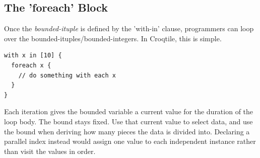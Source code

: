 \subsection*{The 'foreach' Block}

Once the \emph{bounded-ituple} is defined by the 'with-in' clause, programmers can loop over the bounded-ituples/bounded-integers. In Croqtile, this is simple.

\begin{lstlisting}[language=croqtile,caption={The foreach Block}]
with x in [10] {
  foreach x {
    // do something with each x
  }
}
\end{lstlisting}

Each iteration gives the bounded variable a current value for the duration of the loop body. The bound stays fixed. Use that current value to select data, and use the bound when deriving how many pieces the data is divided into. Declaring a parallel index instead would assign one value to each independent instance rather than visit the values in order.

